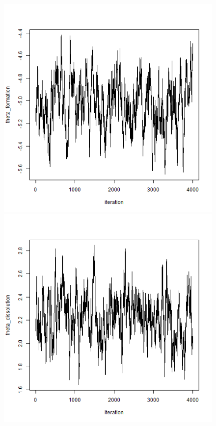 \documentclass[aspectratio=169,ignorenonframetext,9pt]{beamer}
\theoremstyle{plain}
\theoremstyle{definition}
\begin{document}
\begin{figure}[h]
    \begin{center}
        \includegraphics[scale=0.23]{pictures/net3seq_chain1_BSTERGM_formation_traceplot.png}
        \includegraphics[scale=0.23]{pictures/net3seq_chain1_BSTERGM_dissolution_traceplot.png} \\

\end{center}
\end{figure}
\end{document}
